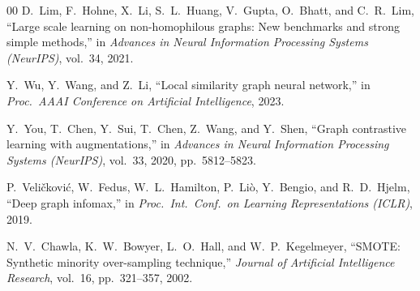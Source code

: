\documentclass[conference]{IEEEtran}
\begin{document}
\begin{thebibliography}{00}
D.~Lim, F.~Hohne, X.~Li, S.~L.~Huang, V.~Gupta, O.~Bhatt, and C.~R.~Lim, ``Large scale learning on non-homophilous graphs: New benchmarks and strong simple methods,'' in \textit{Advances in Neural Information Processing Systems (NeurIPS)}, vol.~34, 2021.

Y.~Wu, Y.~Wang, and Z.~Li, ``Local similarity graph neural network,'' in \textit{Proc.\ AAAI Conference on Artificial Intelligence}, 2023.

Y.~You, T.~Chen, Y.~Sui, T.~Chen, Z.~Wang, and Y.~Shen, ``Graph contrastive learning with augmentations,'' in \textit{Advances in Neural Information Processing Systems (NeurIPS)}, vol.~33, 2020, pp.~5812--5823.

P.~Veli\v{c}kovi\'{c}, W.~Fedus, W.~L.~Hamilton, P.~Li\`{o}, Y.~Bengio, and R.~D.~Hjelm, ``Deep graph infomax,'' in \textit{Proc.\ Int.\ Conf.\ on Learning Representations (ICLR)}, 2019.

N.~V.~Chawla, K.~W.~Bowyer, L.~O.~Hall, and W.~P.~Kegelmeyer, ``SMOTE: Synthetic minority over-sampling technique,'' \textit{Journal of Artificial Intelligence Research}, vol.~16, pp.~321--357, 2002.

\end{thebibliography}
\end{document}

